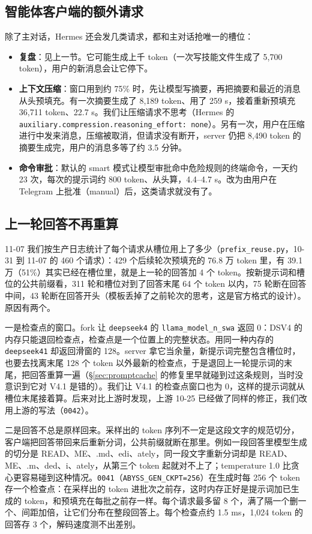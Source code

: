 \documentclass[11pt,a4paper]{article}
\newcommand{\code}[1]{\texttt{#1}}
\begin{document}
\subsection{智能体客户端的额外请求}
\label{sec:hermes}

除了主对话，Hermes 还会发几类请求，都和主对话抢唯一的槽位：
\begin{itemize}
  \item \textbf{复盘}：见上一节。它可能生成上千 token（一次写技能文件生成了 5,700 token），用户的新消息会让它停下。
  \item \textbf{上下文压缩}：窗口用到约 75\% 时，先让模型写摘要，再把摘要和最近的消息从头预填充。有一次摘要生成了 8,189 token、用了 259 s，接着重新预填充 36,711 token、22.7 s。我们让压缩请求不思考（Hermes 的 \code{auxiliary.compression.reasoning\_effort: none}）。另有一次，用户在压缩进行中发来消息，压缩被取消，但请求没有断开，server 仍把 8,490 token 的摘要生成完，用户的消息多等了约 3.5 分钟。
  \item \textbf{命令审批}：默认的 smart 模式让模型审批命中危险规则的终端命令，一天约 23 次，每次的提示词约 800 token、从头算，4.4--4.7 s。改为由用户在 Telegram 上批准（manual）后，这类请求就没有了。
\end{itemize}

\subsection{上一轮回答不再重算}
\label{sec:continue}

11-07 我们按生产日志统计了每个请求从槽位用上了多少（\code{prefix\_reuse.py}，10-31 到 11-07 的 460 个请求）：429 个后续轮次预填充的 76.8 万 token 里，有 39.1 万（51\%）其实已经在槽位里，就是上一轮的回答加 4 个 token。按新提示词和槽位的公共前缀看，311 轮和槽位对到了回答末尾 64 个 token 以内，75 轮断在回答中间，43 轮断在回答开头（模板丢掉了之前轮次的思考，这是官方格式的设计）。原因有两个。

一是检查点的窗口。fork 让 \code{deepseek4} 的 \code{llama\_model\_n\_swa} 返回 0：DSV4 的内存只能退回检查点，检查点是一个位置上的完整状态。用同一种内存的 \code{deepseek41} 却返回滑窗的 128。server 拿它当余量，新提示词完整包含槽位时，也要去找离末尾 128 个 token 以外最新的检查点，于是退回上一轮提示词的末尾，把回答重算一遍（\S\ref{sec:promptcache} 的修复里早就碰到过这条规则，当时没意识到它对 V4.1 是错的）。我们让 V4.1 的检查点窗口也为 0，这样的提示词就从槽位末尾接着算。后来对比上游时发现，上游 10-25 已经做了同样的修正，我们改用上游的写法（\code{0042}）。

二是回答不总是原样回来。采样出的 token 序列不一定是这段文字的规范切分，客户端把回答带回来后重新分词，公共前缀就断在那里。例如一段回答里模型生成的切分是 READ、ME、.md、edi、ately，同一段文字重新分词却是 READ、ME、.m、ded、i、ately，从第三个 token 起就对不上了；temperature 1.0 比贪心更容易碰到这种情况。\code{0041}（\code{ABYSS\_GEN\_CKPT=256}）在生成时每 256 个 token 存一个检查点：在采样出的 token 进批次之前存，这时内存正好是提示词加已生成的 token，和预填充在每批之前存一样。每个请求最多留 8 个，满了隔一个删一个、间距加倍，让它们分布在整段回答上。每个检查点约 1.5 ms，1,024 token 的回答存 3 个，解码速度测不出差别。
\end{document}
